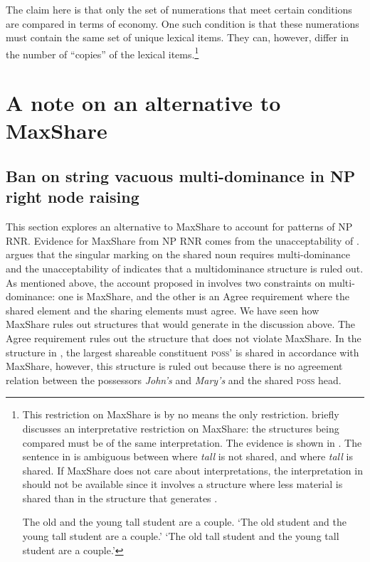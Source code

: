 \documentclass[output=paper]{langscibook}
\begin{document}
The claim here is that only the set of numerations that meet certain conditions are compared in terms of economy. One such condition is that these numerations must contain the same set of unique lexical items. They can, however, differ in the number of ``copies'' of the lexical items.\footnote{This restriction on MaxShare is by no means the only restriction. \citet[Section 2.6.2]{Shen:2018a} briefly discusses an interpretative restriction on MaxShare:  the structures being compared must be of the same interpretation. The evidence is shown in . The sentence in  is ambiguous between  where \textit{tall} is not shared, and  where \textit{tall} is shared. If MaxShare does not care about interpretations, the interpretation in  should not be available since it involves a structure where less material is shared than in the structure that generates .

\ea 
	\label{shenftn8exi}
	The old and the young tall student are a couple.
	\ea 
		\label{shenftn8exi:a}
		`The old student and the young tall student are a couple.'
	\ex 
		\label{shenftn8exi:b}
		`The old tall student and the young tall student are a couple.'
	\z 
\z 
}


\section{A note on an alternative to MaxShare}
\label{shensect:alternatives}

\subsection{Ban on string vacuous multi-dominance in NP right node raising}
\label{shensect:ban}

This section explores an alternative to MaxShare to account for patterns of NP RNR. Evidence for MaxShare from NP RNR comes from the unacceptability of . \citet{Shen:2018a} argues that the singular marking on the shared noun requires multi-dominance and the unacceptability of  indicates that a multidominance structure is ruled out. As mentioned above, the account proposed in \citet{Shen:2018a} involves two constraints on multi-dominance: one is MaxShare, and the other is an Agree requirement where the shared element and the sharing elements must agree. We have seen how MaxShare rules out structures that would generate  in the discussion above. The Agree requirement rules out the structure that does not violate MaxShare. In the structure in , the largest shareable constituent \textsc{poss'} is shared in accordance with MaxShare, however, this structure is ruled out because there is no agreement relation between the possessors \textit{John's} and \textit{Mary's} and the shared \textsc{poss} head.
\end{document}
